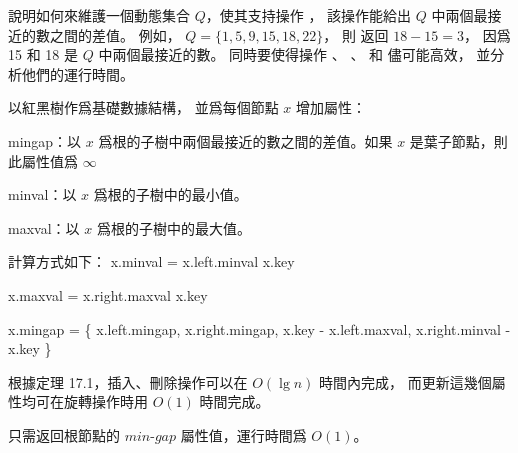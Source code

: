\startEXERCISE
說明如何來維護一個動態集合 $Q$，使其支持操作 ，
該操作能給出 $Q$ 中兩個最接近的數之間的差值。
例如， $Q=\{1,5,9,15,18,22\}$，
則  返回 $18-15=3$，
因爲 15 和 18 是 $Q$ 中兩個最接近的數。
同時要使得操作 、 、  和  儘可能高效，
並分析他們的運行時間。
\stopEXERCISE

\startANSWER
以紅黑樹作爲基礎數據結構，
並爲每個節點 $x$ 增加屬性：
\startigBase
\item min\text{-}gap：以 $x$ 爲根的子樹中兩個最接近的數之間的差值。如果 $x$ 是葉子節點，則此屬性值爲 $\infty$
\item min\text{-}val：以 $x$ 爲根的子樹中的最小值。
\item max\text{-}val：以 $x$ 爲根的子樹中的最大值。
\stopigBase

計算方式如下：
\startformula
x.min\text{-}val = \startmathcases
\NC x.left.min\text{-}val \NC {} \NR
\NC x.key \NC {} \NR
\stopmathcases
\stopformula

\startformula
x.max\text{-}val = \startmathcases
\NC x.right.max\text{-}val \NC {} \NR
\NC x.key \NC {} \NR
\stopmathcases
\stopformula

\startsplitformula\startmathalignment
\NC x.min\text{-}gap = \min\{ \NC
  x.left.min\text{-}gap, \NR
\NC \NC x.right.min\text{-}gap, \NR
\NC \NC x.key - x.left.max\text{-}val, \NR
\NC \NC x.right.min\text{-}val - x.key \} \NR
\stopmathalignment\stopsplitformula


根據定理 17.1，插入、刪除操作可以在 $O(\lg n)$ 時間內完成，
而更新這幾個屬性均可在旋轉操作時用 $O(1)$ 時間完成。

 只需返回根節點的 $min\text{-}gap$ 屬性值，運行時間爲 $O(1)$。
\stopANSWER
